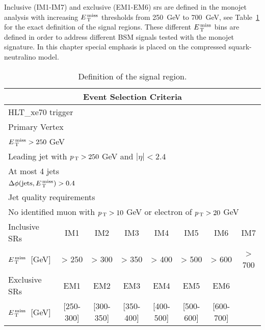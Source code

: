 Inclusive (IM1-IM7) and exclusive (EM1-EM6) \glspl{sr} are defined in the
monojet analysis with increasing $E_\mathrm{\, T}^\mathrm{\, miss}$ thresholds from 250~GeV to 700~GeV, see
Table~\ref{tab:event_selection} for the exact definition of the signal
regions. These different $E_\mathrm{\, T}^\mathrm{\, miss}$ bins are defined in order to address different
BSM signals tested with the monojet signature. In this chapter special emphasis
is placed on the compressed squark-neutralino model.
\begin{table}[!th]
  \centering
  \begin{tabular}{@{}l@{}c@{}c@{}c@{}c@{}c@{}c@{}c}
    \toprule
    \multicolumn{8}{c}{Event Selection Criteria} \\
    \midrule \midrule
    \multicolumn{8}{l}{HLT\_xe70 trigger} \\
    \multicolumn{8}{l}{Primary Vertex} \\
    \multicolumn{8}{l}{$E_\mathrm{\, T}^\mathrm{\, miss} > 250~$GeV} \\
    \multicolumn{8}{l}{Leading jet with $p_\mathrm{\, T} > 250~$GeV and $|\eta| < 2.4$} \\
    \multicolumn{8}{l}{At most 4 jets} \\
    \multicolumn{8}{l}{$\Delta \phi (\mathrm{jets}, E_\mathrm{\, T}^\mathrm{\, miss}) > 0.4$} \\
    \multicolumn{8}{l}{Jet quality requirements} \\
    \multicolumn{8}{l}{No identified muon with $p_\mathrm{\, T} > 10~$GeV or electron of
    $p_\mathrm{\, T} > 20~$GeV} \\
    \midrule
    Inclusive SRs & IM1 & IM2 & IM3 & IM4 & IM5 & IM6 & IM7 \\
    $E_\mathrm{\, T}^\mathrm{\, miss}$~[GeV] & > 250 & > 300 & > 350 & > 400 & > 500 & > 600 & > 700 \\
    \midrule
    Exclusive SRs & EM1 & EM2 & EM3 & EM4 & EM5 & EM6 \\
    $E_\mathrm{\, T}^\mathrm{\, miss}$~[GeV] & [250-300] & [300-350] & [350-400] & [400-500] &
    [500-600] & [600-700] \\
    \bottomrule
  \end{tabular}
  \caption{Definition of the signal region.}
  \label{tab:event_selection}
\end{table}
